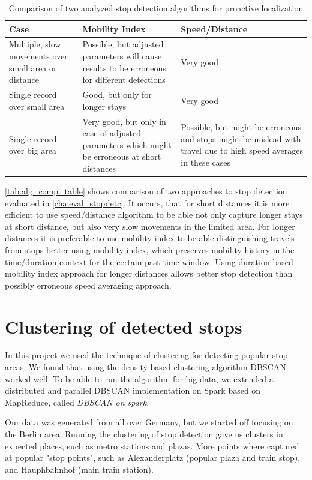 \begin{table}[ht!]
	\centering
	\caption{Comparison of two analyzed stop detection algorithms for proactive localization}
	\label{tab:alg_comp_table}
	\begin{tabular}{|L|L|L|}
		\textbf{Case} & \textbf{Mobility Index} & \textbf{Speed/Distance} 
		\\\hline
		Multiple, slow movements over small area or distance & Possible, but adjusted parameters will cause results to be erroneous for different detections & Very good
		\\\hline
		Single record over small area & Good, but only for longer stays & Very good  
		\\\hline
		Single record over big area & Very good, but only in case of adjusted parameters which might be erroneous at short distances & Possible, but might be erroneous and stops might be mislead with travel due to high speed averages in these cases
		\\\hline
	\end{tabular}
\end{table}

\FloatBarrier

\autoref{tab:alg_comp_table} shows comparison of two approaches to stop detection evaluated in \autoref{cha:eval_stopdetc}. It occurs, that for short distances it is more efficient to use speed/distance algorithm to be able not only capture longer stays at short distance, but also very slow movements in the limited area. For longer distances it is preferable to use mobility index to be able distinguishing travels from stops better using mobility index, which preserves mobility history in the time/duration context for the certain past time window. Using duration based mobility index approach for longer distances allows better stop detection than possibly erroneous speed averaging approach.

\section{Clustering of detected stops}
In this project we used the technique of clustering for detecting popular stop areas. We found that using the density-based clustering algorithm DBSCAN worked well. To be able to run the algorithm for big data, we extended a distributed and parallel DBSCAN implementation on Spark based on MapReduce, called \textit{DBSCAN on spark}. 

Our data was generated from all over Germany, but we started off focusing on the Berlin area. Running the clustering of stop detection gave us clusters in expected places, such as metro stations and plazas. More points where captured at popular "stop points", such as Alexanderplatz (popular plaza and train stop), and Hauphbahnhof (main train station). 

